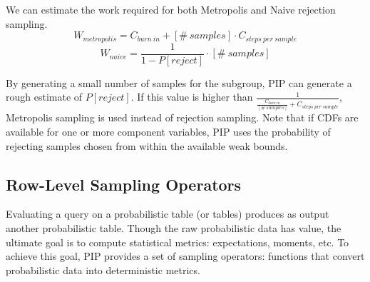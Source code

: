 We can estimate the work required for both Metropolis and Naive rejection sampling.
$$W_{metropolis} = C_{burn\ in} + [\#\ samples] \cdot C_{steps\ per\ sample}$$
$$W_{naive} = \frac{1}{1-P[reject]} \cdot [\#\ samples]$$

By generating a small number of samples for the subgroup, PIP can generate a rough estimate of $P[reject]$.  If this value is higher than $\frac{1}{\frac{C_{burn\ in}}{[\#\ samples]} + C_{steps\ per\ sample}}$, Metropolis sampling is used instead of rejection sampling.  Note that if CDFs are available for one or more component variables, PIP uses the probability of rejecting samples chosen from within the available weak bounds.


%
%
%


\subsection{Row-Level Sampling Operators}
Evaluating a query on a probabilistic table (or tables) produces as output another probabilistic table.  Though the raw probabilistic data has value, the ultimate goal is to compute statistical metrics: expectations, moments, etc.  To achieve this goal, PIP provides a set of sampling operators: functions that convert probabilistic data into deterministic metrics.  

